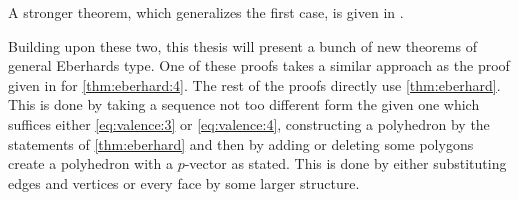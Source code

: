A stronger theorem, which generalizes the first case, is given in \cite{jendrol1977generalization}.

Building upon these two, this thesis will present a bunch of new theorems of general Eberhards type. One of these proofs takes a similar approach as the proof given in \cite{ConvexPolytopes} for \autoref{thm:eberhard:4}. The rest of the proofs directly use \autoref{thm:eberhard}. This is done by taking a sequence not too different form the given one which suffices either \autoref{eq:valence:3} or \autoref{eq:valence:4}, constructing a polyhedron by the statements of \autoref{thm:eberhard} and then by adding or deleting some polygons create a polyhedron with a $p$-vector as stated. This is done by either substituting edges and vertices or every face by some larger structure. 


